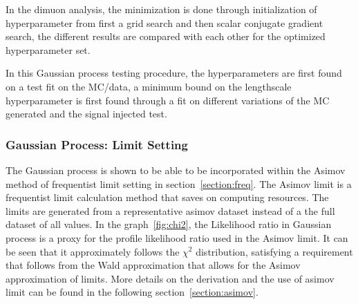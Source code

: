     In the dimuon analysis, the minimization is done through initialization of hyperparameter from first a grid search and then scalar conjugate gradient search, the different results are compared with each other for the optimized hyperparameter set.

    In this Gaussian process testing procedure, the hyperparameters are first found on a test fit on the MC/data, a minimum bound on the lengthscale hyperparameter is first found through a fit on different variations of the MC generated and the signal injected test.


    \subsubsection{Gaussian Process: Limit Setting}

    The Gaussian process is shown to be able to be incorporated within the Asimov method of frequentist limit setting in section~\ref{section:freq}. The Asimov limit is a frequentist limit calculation method that saves on computing resources. The limits are generated from a representative asimov dataset instead of a the full dataset of all values.
    In the graph~\ref{fig:chi2}, the Likelihood ratio in Gaussian process is a proxy for the profile likelihood ratio used in the Asimov limit. It can be seen that it approximately follows the $\chi^{2}$ distribution, satisfying a requirement that follows from the Wald approximation that allows for the Asimov approximation of limits.
    More details on the derivation and the use of asimov limit can be found in the following section~\ref{section:asimov}.

